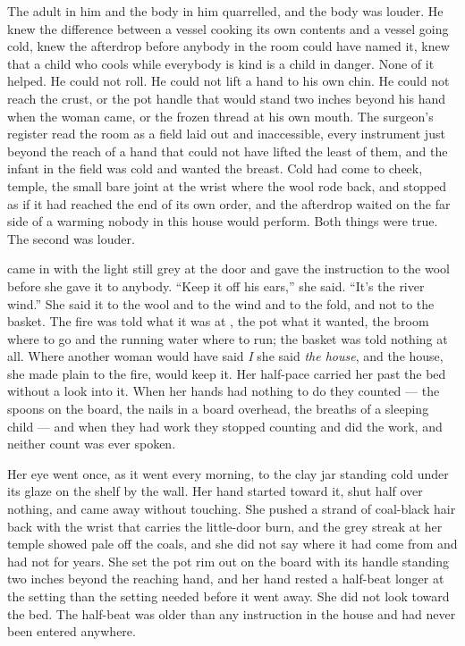 The adult in him and the body in him quarrelled, and the body was louder. He knew the difference between a vessel cooking its own contents and a vessel going cold, knew the afterdrop before anybody in the room could have named it, knew that a child who cools while everybody is kind is a child in danger. None of it helped. He could not roll. He could not lift a hand to his own chin. He could not reach the crust, or the pot handle that would stand two inches beyond his hand when the woman came, or the frozen thread at his own mouth. The surgeon's register read the room as a field laid out and inaccessible, every instrument just beyond the reach of a hand that could not have lifted the least of them, and the infant in the field was cold and wanted the breast. Cold had come to cheek, temple, the small bare joint at the wrist where the wool rode back, and stopped as if it had reached the end of its own order, and the afterdrop waited on the far side of a warming nobody in this house would perform. Both things were true. The second was louder.

\scenebreak

 came in with the light still grey at the door and gave the instruction to the wool before she gave it to anybody. “Keep it off his ears,” she said. “It's the river wind.” She said it to the wool and to the wind and to the fold, and not to the basket. The fire was told what it was at , the pot what it wanted, the broom where to go and the running water where to run; the basket was told nothing at all. Where another woman would have said \emph{I} she said \emph{the house}, and the house, she made plain to the fire, would keep it. Her half-pace carried her past the bed without a look into it. When her hands had nothing to do they counted — the spoons on the board, the nails in a board overhead, the breaths of a sleeping child — and when they had work they stopped counting and did the work, and neither count was ever spoken.

Her eye went once, as it went every morning, to the clay jar standing cold under its glaze on the shelf by the wall. Her hand started toward it, shut half over nothing, and came away without touching. She pushed a strand of coal-black hair back with the wrist that carries the little-door burn, and the grey streak at her temple showed pale off the coals, and she did not say where it had come from and had not for years. She set the pot rim out on the board with its handle standing two inches beyond the reaching hand, and her hand rested a half-beat longer at the setting than the setting needed before it went away. She did not look toward the bed. The half-beat was older than any instruction in the house and had never been entered anywhere.

